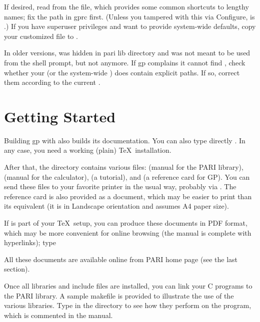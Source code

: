 If desired, read   from the 
file, which provides some common shortcuts to lengthy names; fix the path in
gprc first. (Unless you tampered with this via Configure,  is
.) If you have superuser privileges and want to
provide system-wide defaults, copy your customized  file to
.

In older versions,  was hidden in pari lib directory and was not
meant to be used from the shell prompt, but not anymore. If gp complains it
cannot find , check whether your  (or the system-wide
) does contain explicit paths. If so, correct them according to the
current .

\section{Getting Started}

 Building gp with  also builds
its documentation. You can also type directly . In any case,
you need a working (plain) \TeX\ installation.

After that, the  directory contains various  files:
 (manual for the PARI library),  (manual
for the  calculator),  (a tutorial), and
 (a reference card for GP). You can send these files to your
favorite printer in the usual way, probably via . The reference
card is also provided as a  document, which may be easier to
print than its  equivalent (it is in Landscape orientation and
assumes A4 paper size).

\noindent If  is part of your \TeX\ setup, you can produce these
documents in PDF format, which may be more convenient for online browsing
(the manual is complete with hyperlinks); type


\noindent All these documents are available online from PARI home page
(see the last section).

 Once all libraries and include files are installed,
you can link your C programs to the PARI library. A sample makefile
 is provided to illustrate the use of the various
libraries. Type  in the  directory to see how
they perform on the  program, which is commented in the
manual.

